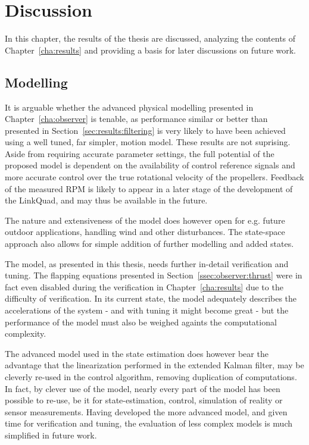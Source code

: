 \chapter{Discussion}
\label{cha:discussion}
    In this chapter, the results of the thesis are discussed,
    analyzing the contents of Chapter~\ref{cha:results} and providing
    a basis for later discussions on future work.

    \section{Modelling}
        It is arguable whether the advanced physical modelling presented
        in Chapter~\ref{cha:observer} is tenable, as performance similar or better
        than presented in Section~\ref{sec:results:filtering} is very likely
        to have been achieved using a well tuned, far simpler, motion model.
        These results are not suprising.
        Aside from requiring accurate parameter settings, the full potential of the
        proposed model is dependent on the availability of control reference
        signals and more accurate control over the true rotational velocity of
        the propellers. Feedback of the measured RPM is likely to appear in
        a later stage of the development of the LinkQuad, and may thus
        be available in the future.

        The nature and extensiveness of the model does however open
        for e.g. future outdoor applications, handling wind and other
        disturbances. The state-space approach also allows for simple addition
        of further modelling and added states.

        The model, as presented in this thesis, needs further in-detail
        verification and tuning. The flapping equations presented in
        Section~\ref{ssec:observer:thrust} were in fact even disabled during
        the verification in Chapter~\ref{cha:results} due to the
        difficulty of verification. In its current state, the model
        adequately describes the accelerations of the system - and with tuning it might become great -
        but the performance of the model must also be weighed againts
        the computational complexity.

        The advanced model used in the state estimation does however bear the
        advantage that the linearization performed in the extended Kalman filter,
        may be cleverly re-used in the control algorithm, removing duplication
        of computations. In fact, by clever use of the model,
        nearly every part of the model has been possible to re-use, be it for
        state-estimation, control, simulation of reality or sensor measurements.
        Having developed the more advanced model, and given time for
        verification and tuning, the evaluation of less complex models is much
        simplified in future work.

